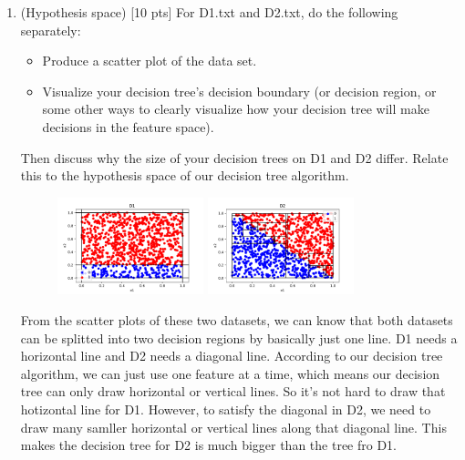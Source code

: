 \documentclass[a4paper]{article}
\theoremstyle{definition}
\newenvironment{soln}{
    \leavevmode\color{blue}\ignorespaces
}{}
\begin{document}
\begin{enumerate}
\item (Hypothesis space)  [10 pts] For D1.txt and D2.txt, do the following separately:
  \begin{itemize}
  \item Produce a scatter plot of the data set.
  \item Visualize your decision tree's decision boundary (or decision region, or some other ways to clearly visualize how your decision tree will make decisions in the feature space).
  \end{itemize}
Then discuss why the size of your decision trees on D1 and D2 differ.  Relate this to the hypothesis space of our decision tree algorithm. 
\begin{soln} 
	    \begin{figure}[H]
	        \centering
	        \includegraphics[width=0.4\textwidth]{question6_1.pdf}
		 \includegraphics[width=0.4\textwidth]{question6_2.pdf}	
	        \captionsetup{labelformat=empty}
	        \caption{}
	        \label{fig:my_label}
	    \end{figure}

From the scatter plots of these two datasets, we can know that both datasets can be splitted into two decision regions by basically just one line. D1 needs a horizontal line and D2 needs a diagonal line. According to our decision tree algorithm, we can just use one feature at a time, which means our decision tree can only draw horizontal or vertical lines. So it's not hard to draw that hotizontal line for D1. However, to satisfy the diagonal in D2, we need to draw many samller horizontal or vertical lines along that diagonal line. This makes the decision tree for D2 is much bigger than the tree fro D1.

\end{soln}


\end{enumerate}
\end{document}
